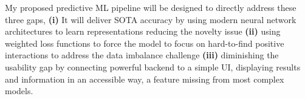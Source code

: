 My proposed predictive ML pipeline will be designed to directly address these three gaps, \textbf{(i)} It will deliver SOTA accuracy by using modern neural network architectures to learn representations reducing the novelty issue \textbf{(ii)} using weighted loss functions to force the model to focus on hard-to-find positive interactions to address the data imbalance challenge \textbf{(iii)} diminishing the usability gap by connecting powerful backend to a simple UI, displaying results and information in an accessible way, a feature missing from most complex models.



